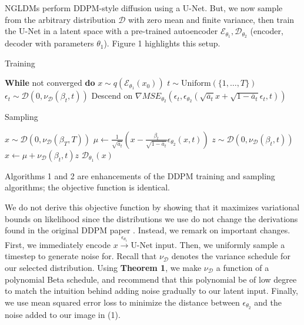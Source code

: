 \documentclass[10pt,twocolumn,letterpaper]{article}
\begin{document}
NGLDMs perform DDPM-style diffusion using a U-Net. But, we now sample from the arbitrary distribution $\mathcal{D}$ with zero mean and finite variance, then train the U-Net in a latent space with a pre-trained autoencoder $\mathscr{E}_{\theta_1},\mathscr{D}_{\theta_2}$ (encoder, decoder with parameters $\theta_1$). Figure 1 highlights this setup.

\begin{algorithm}
\caption{Training}\label{alg:Func}
\begin{algorithmic}[1]
\State \textbf{While} {not converged} \textbf{do}
\State \( x \sim q(\mathscr{E}_{\theta_1}(x_0)) \)
\State \( t \sim \text{Uniform}(\{1,\ldots,T\}) \)
\State \( \epsilon_t \sim \mathcal{D}(0, \nu_{\mathcal{D}}(\beta_t,t)) \)
\State Descend on $\nabla MSE_{\theta_2}(\epsilon_t,\epsilon_{\theta_2}(\sqrt{\overline{a}_t}x+\sqrt{1-\overline{a}_t}\epsilon_t,t))$
\end{algorithmic}
\end{algorithm}

\begin{algorithm}
\caption{Sampling}\label{alg:Func}
\begin{algorithmic}[1]
\State \( x \sim \mathcal{D}(0,\nu_{\mathcal{D}}(\beta_T,T)) \)
    \State \( \mu \gets \frac{1}{\sqrt{\overline{a}_t}}\left( x-\frac{\beta_t}{\sqrt{1-\overline{a}_t}}\epsilon_{\theta_2}(x,t) \right) \)
    \State \( z \sim  \mathcal{D}(0,\nu_{\mathcal{D}}(\beta_t,t)) \)
    \State \( x \gets \mu + \nu_{\mathcal{D}}(\beta_t,t)z \)
\EndFor
\State \Return \( \mathscr{D}_{\theta_1}(x) \)
\end{algorithmic}
\end{algorithm}

Algorithms 1 and 2 are enhancements of the DDPM training and sampling algorithms; the objective function is identical.

We do not derive this objective function by showing that it maximizes variational bounds on likelihood since the distributions we use do not change the derivations found in the original DDPM paper \cite{DBLP:journals/corr/abs-2006-11239}. Instead, we remark on important changes. First, we immediately encode $x\overset{\mathscr{\epsilon}_{\theta_1}}{\to}\text{U-Net input}$. Then, we uniformly sample a timestep to generate noise for. Recall that $\nu_\mathcal{D}$ denotes the variance schedule for our selected distribution. Using \textbf{Theorem 1}, we make $\nu_{\mathcal{D}}$ a function of a polynomial Beta schedule, and recommend that this polynomial be of low degree to match the intuition behind adding noise gradually to our latent input. Finally, we use mean squared error loss to minimize the distance between $\epsilon_{\theta_2}$ and the noise added to our image in (1).
\end{document}

